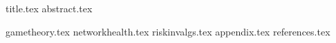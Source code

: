 \documentclass[11pt]{llncs}
\begin{document}
  {title.tex}
  \thispagestyle{plain}
  {abstract.tex}

  {gametheory.tex}
  {networkhealth.tex}
  {riskinvalgs.tex}
  {appendix.tex}
  {references.tex}
\end{document}
